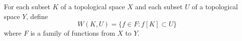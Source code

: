 For each subset $K$ of a topological space $X$ and each subset $U$ of a topological space $Y$, define
$$W(K, U) = \{f \in F : f[K] \subset U\}$$
where $F$ is a family of functions from $X$ to $Y$.
